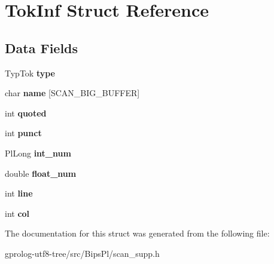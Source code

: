 \hypertarget{structTokInf}{}\section{Tok\+Inf Struct Reference}
\label{structTokInf}
\subsection*{Data Fields}
\begin{DoxyCompactItemize}
\item 
Typ\+Tok {\bfseries type}\hypertarget{structTokInf_a9ae46e898f23f677836fa19cc119276b}{}\label{structTokInf_a9ae46e898f23f677836fa19cc119276b}

\item 
char {\bfseries name} \mbox{[}S\+C\+A\+N\+\_\+\+B\+I\+G\+\_\+\+B\+U\+F\+F\+ER\mbox{]}\hypertarget{structTokInf_aa56c61670fa2e571afc6647c76af2103}{}\label{structTokInf_aa56c61670fa2e571afc6647c76af2103}

\item 
int {\bfseries quoted}\hypertarget{structTokInf_aedaf8feef7d9708e8a946df56d7cdb66}{}\label{structTokInf_aedaf8feef7d9708e8a946df56d7cdb66}

\item 
int {\bfseries punct}\hypertarget{structTokInf_addc6977c79a52835a28c0347c453df5d}{}\label{structTokInf_addc6977c79a52835a28c0347c453df5d}

\item 
Pl\+Long {\bfseries int\+\_\+num}\hypertarget{structTokInf_a9f5266be5fc6a8e446ed3e660032d0ad}{}\label{structTokInf_a9f5266be5fc6a8e446ed3e660032d0ad}

\item 
double {\bfseries float\+\_\+num}\hypertarget{structTokInf_afddf6ad76bb496c8ddd35a5b773f4360}{}\label{structTokInf_afddf6ad76bb496c8ddd35a5b773f4360}

\item 
int {\bfseries line}\hypertarget{structTokInf_a141b87290988df7a09d0f84593cd02c5}{}\label{structTokInf_a141b87290988df7a09d0f84593cd02c5}

\item 
int {\bfseries col}\hypertarget{structTokInf_a3034cb3570c3c0a946e3e1c86b0464a7}{}\label{structTokInf_a3034cb3570c3c0a946e3e1c86b0464a7}

\end{DoxyCompactItemize}


The documentation for this struct was generated from the following file\+:\begin{DoxyCompactItemize}
\item 
gprolog-\/utf8-\/tree/src/\+Bips\+Pl/scan\+\_\+supp.\+h\end{DoxyCompactItemize}
